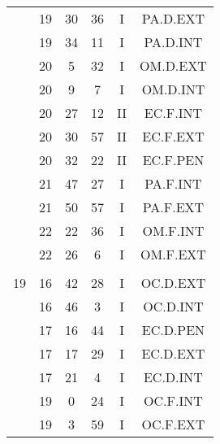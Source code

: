 \documentclass[12pt, a4paper]{article}
\begin{document}
\begin{multicols}{3}
{\begin{tabular}{c c c c c c}
	 	 	 	 & 19 & 30 & 36 & I & PA.D.EXT\\%
	 	 	 	 & 19 & 34 & 11 & I & PA.D.INT\\%
	 	 	 	 & 20 & 5 & 32 & I & OM.D.EXT\\%
	 	 	 	 & 20 & 9 & 7 & I & OM.D.INT\\%
	 	 	 	 & 20 & 27 & 12 & II & EC.F.INT\\%
	 	 	 	 & 20 & 30 & 57 & II & EC.F.EXT\\%
	 	 	 	 & 20 & 32 & 22 & II & EC.F.PEN\\%
	 	 	 	 & 21 & 47 & 27 & I & PA.F.INT\\%
	 	 	 	 & 21 & 50 & 57 & I & PA.F.EXT\\%
	 	 	 	 & 22 & 22 & 36 & I & OM.F.INT\\%
	 	 	 	 & 22 & 26 & 6 & I & OM.F.EXT\\%
	 	 	 	 & & & & & \\%
	 	 	 	19 & 16 & 42 & 28 & I & OC.D.EXT\\%
	 	 	 	 & 16 & 46 & 3 & I & OC.D.INT\\%
	 	 	 	 & 17 & 16 & 44 & I & EC.D.PEN\\%
	 	 	 	 & 17 & 17 & 29 & I & EC.D.EXT\\%
	 	 	 	 & 17 & 21 & 4 & I & EC.D.INT\\%
	 	 	 	 & 19 & 0 & 24 & I & OC.F.INT\\%
	 	 	 	 & 19 & 3 & 59 & I & OC.F.EXT\\%
	 	 \end{tabular}
 	}
\end{multicols}
\end{document}
